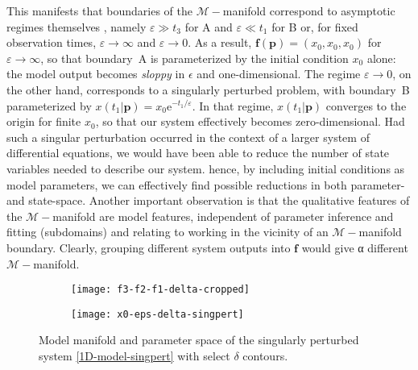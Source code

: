This manifests that boundaries of the $\mathcal{M}-$manifold
correspond to asymptotic regimes themselves \cite{TQ}, namely
$\varepsilon \gg t_3$ for A and $\varepsilon \ll t_1$ for B or, for
fixed observation times, $\varepsilon \to \infty$ and
$\varepsilon \to 0$.  As a result,
$\mathbf{f}(\mathbf{p}) = (x_0,x_0,x_0)$ for $\varepsilon \to \infty$,
so that boundary~A is parameterized by the initial condition $x_0$
alone: the model output becomes \emph{sloppy} in $\epsilon$ and
one-dimensional.  The regime $\varepsilon \to 0$, on the other hand,
corresponds to a singularly perturbed problem, with boundary~B
parameterized by
$x(t_1 \vert \mathbf{p}) = x_0\mathrm{e}^{-t_1/\varepsilon}$.  In that
regime, $x(t_1 \vert \mathbf{p})$ converges to the origin for finite
$x_0$, so that our system effectively becomes zero-dimensional.  Had
such a singular perturbation occurred in the context of a larger
system of differential equations, we would have been able to reduce
the number of state variables needed to describe our system.  hence,
by including initial conditions as model parameters, we can
effectively find possible reductions in both parameter- and
state-space.  Another important observation is that the qualitative
features of the $\mathcal{M}-$manifold are model features, independent
of parameter inference and fitting (subdomains) and relating to
working in the vicinity of an $\mathcal{M}-$manifold boundary.
Clearly, grouping different system outputs into $\mathbf{f}$ would
give α different $\mathcal{M}-$manifold.

\begin{figure*}
  \centering
  \begin{subfigure}[t]{0.45\linewidth}
    \centering
    \texttt{[image: f3-f2-f1-delta-cropped]}
  \end{subfigure}
  \hspace{0.5cm}
  \begin{subfigure}[t]{0.45\linewidth}
    \centering
    \texttt{[image: x0-eps-delta-singpert]}
  \end{subfigure}
  \caption[Model manifold and parameter space of the singularly
    perturbed system]{Model manifold and parameter space of the singularly
    perturbed system \eqref{1D-model-singpert} with select $\delta$
    contours.
    \label{fig:sing-pert} }
\end{figure*}
% 

